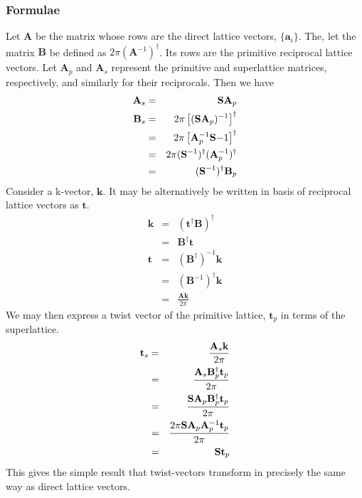 \subsubsection{Formulae}
\newcommand{\Amat}{\mathbf{A}} 
\newcommand{\Bmat}{\mathbf{B}} 
\renewcommand{\vk}{\mathbf{k}}
\newcommand{\vt}{\mathbf{t}}

Let $\Amat$ be the matrix whose rows are the direct lattice vectors,
$\{\mathbf{a}_i\}$.  The, let the matrix $\Bmat$ be defined as
$2\pi(\Amat^{-1})^\dagger$.  Its rows are the primitive reciprocal
lattice vectors.  Let $\Amat_p$ and $\Amat_s$ represent the primitive
and superlattice matrices, respectively, and similarly for their
reciprocals.  Then we have
\begin{eqnarray}
\Amat_s & = & \Smat \Amat_p \\
\Bmat_s & = & 2\pi\left[(\Smat \Amat_p)^{-1}\right]^\dagger \\
        & = & 2\pi\left[\Amat_p^{-1} \Smat{-1}\right]^\dagger \\
        & = & 2\pi(\Smat^{-1})^\dagger (\Amat_p^{-1})^\dagger \\
        & = & (\Smat^{-1})^\dagger \Bmat_p
\end{eqnarray}  
Consider a k-vector, $\vk$.  It may be alternatively be written in
basis of reciprocal lattice vectors as $\vt$.  
\begin{eqnarray}
\vk & = & (\vt^\dagger \Bmat)^\dagger \\
    & = & \Bmat^\dagger \vt           \\
\vt & = & (\Bmat^\dagger)^{-1} \vk    \\
    & = & (\Bmat^{-1})^\dagger \vk    \\
    & = & \frac{\Amat \vk}{2\pi}
\end{eqnarray}
We may then express a twist vector of the primitive lattice, $\vt_p$ in terms
of the superlattice.
\begin{eqnarray}
\vt_s & = & \frac{\Amat_s \vk}{2\pi}                           \\
      & = & \frac{\Amat_s \Bmat_p^\dagger \vt_p}{2\pi}         \\
      & = & \frac{\Smat \Amat_p \Bmat_p^\dagger \vt_p}{2\pi}   \\
      & = & \frac{2\pi \Smat \Amat_p \Amat_p^{-1} \vt_p}{2\pi} \\
      & = & \Smat \vt_p
\end{eqnarray}
This gives the simple result that twist-vectors transform in precisely
the same way as direct lattice vectors.




